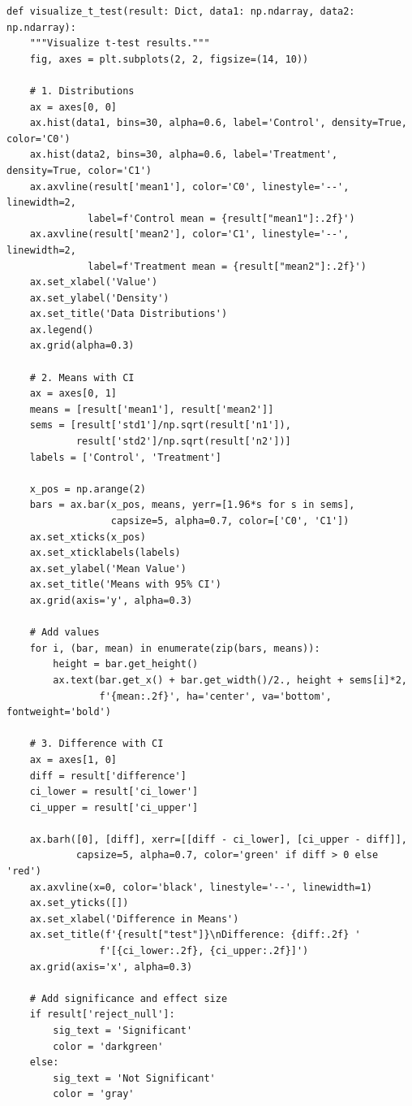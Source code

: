 \begin{lstlisting}
def visualize_t_test(result: Dict, data1: np.ndarray, data2: np.ndarray):
    """Visualize t-test results."""
    fig, axes = plt.subplots(2, 2, figsize=(14, 10))

    # 1. Distributions
    ax = axes[0, 0]
    ax.hist(data1, bins=30, alpha=0.6, label='Control', density=True, color='C0')
    ax.hist(data2, bins=30, alpha=0.6, label='Treatment', density=True, color='C1')
    ax.axvline(result['mean1'], color='C0', linestyle='--', linewidth=2,
              label=f'Control mean = {result["mean1"]:.2f}')
    ax.axvline(result['mean2'], color='C1', linestyle='--', linewidth=2,
              label=f'Treatment mean = {result["mean2"]:.2f}')
    ax.set_xlabel('Value')
    ax.set_ylabel('Density')
    ax.set_title('Data Distributions')
    ax.legend()
    ax.grid(alpha=0.3)

    # 2. Means with CI
    ax = axes[0, 1]
    means = [result['mean1'], result['mean2']]
    sems = [result['std1']/np.sqrt(result['n1']),
            result['std2']/np.sqrt(result['n2'])]
    labels = ['Control', 'Treatment']

    x_pos = np.arange(2)
    bars = ax.bar(x_pos, means, yerr=[1.96*s for s in sems],
                  capsize=5, alpha=0.7, color=['C0', 'C1'])
    ax.set_xticks(x_pos)
    ax.set_xticklabels(labels)
    ax.set_ylabel('Mean Value')
    ax.set_title('Means with 95% CI')
    ax.grid(axis='y', alpha=0.3)

    # Add values
    for i, (bar, mean) in enumerate(zip(bars, means)):
        height = bar.get_height()
        ax.text(bar.get_x() + bar.get_width()/2., height + sems[i]*2,
                f'{mean:.2f}', ha='center', va='bottom', fontweight='bold')

    # 3. Difference with CI
    ax = axes[1, 0]
    diff = result['difference']
    ci_lower = result['ci_lower']
    ci_upper = result['ci_upper']

    ax.barh([0], [diff], xerr=[[diff - ci_lower], [ci_upper - diff]],
            capsize=5, alpha=0.7, color='green' if diff > 0 else 'red')
    ax.axvline(x=0, color='black', linestyle='--', linewidth=1)
    ax.set_yticks([])
    ax.set_xlabel('Difference in Means')
    ax.set_title(f'{result["test"]}\nDifference: {diff:.2f} '
                f'[{ci_lower:.2f}, {ci_upper:.2f}]')
    ax.grid(axis='x', alpha=0.3)

    # Add significance and effect size
    if result['reject_null']:
        sig_text = 'Significant'
        color = 'darkgreen'
    else:
        sig_text = 'Not Significant'
        color = 'gray'


\end{lstlisting}
